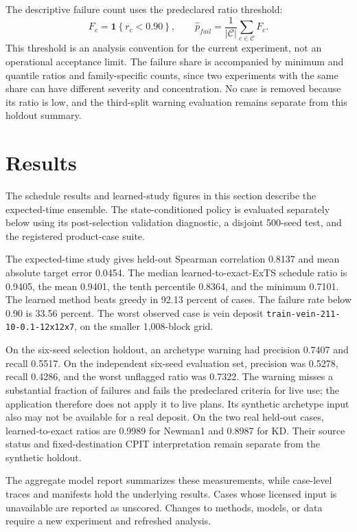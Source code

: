 \documentclass[11pt]{article}
\begin{document}
The descriptive failure count uses the predeclared ratio threshold:
\begin{equation}
 F_c=\mathbf 1\left\{r_c<0.90\right\},\qquad
 \widehat p_{fail}=\frac{1}{|\mathcal C|}\sum_{c\in\mathcal C}F_c.
\end{equation}
This threshold is an analysis convention for the current experiment, not an operational acceptance limit. The failure share is accompanied by minimum and quantile ratios and family-specific counts, since two experiments with the same share can have different severity and concentration. No case is removed because its ratio is low, and the third-split warning evaluation remains separate from this holdout summary.
\section{Results}
The schedule results and learned-study figures in this section describe the expected-time ensemble. The state-conditioned policy is evaluated separately below using its post-selection validation diagnostic, a disjoint 500-seed test, and the registered product-case suite.

The expected-time study gives held-out Spearman correlation 0.8137 and mean absolute target error 0.0454. The median learned-to-exact-ExTS schedule ratio is 0.9405, the mean 0.9401, the tenth percentile 0.8364, and the minimum 0.7101. The learned method beats greedy in 92.13 percent of cases. The failure rate below 0.90 is 33.56 percent. The worst observed case is vein deposit \texttt{train-vein-211-10-0.1-12x12x7}, on the smaller 1,008-block grid.

On the six-seed selection holdout, an archetype warning had precision 0.7407 and recall 0.5517. On the independent six-seed evaluation set, precision was 0.5278, recall 0.4286, and the worst unflagged ratio was 0.7322. The warning misses a substantial fraction of failures and fails the predeclared criteria for live use; the application therefore does not apply it to live plans. Its synthetic archetype input also may not be available for a real deposit. On the two real held-out cases, learned-to-exact ratios are 0.9989 for Newman1 and 0.8987 for KD. Their source status and fixed-destination CPIT interpretation remain separate from the synthetic holdout.

The aggregate model report summarizes these measurements, while case-level traces and manifests hold the underlying results. Cases whose licensed input is unavailable are reported as unscored. Changes to methods, models, or data require a new experiment and refreshed analysis.
\end{document}

